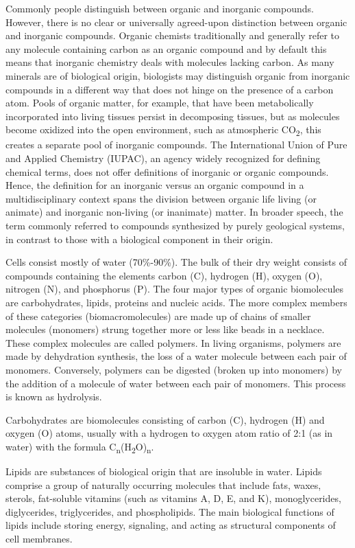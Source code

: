 \documentclass[]{book}
\begin{document}
Commonly people distinguish between organic and inorganic compounds. However, there is no clear or universally agreed-upon distinction between organic and inorganic compounds. Organic chemists traditionally and generally refer to any molecule containing carbon as an organic compound and by default this means that inorganic chemistry deals with molecules lacking carbon. As many minerals are of biological origin, biologists may distinguish organic from inorganic compounds in a different way that does not hinge on the presence of a carbon atom. Pools of organic matter, for example, that have been metabolically incorporated into living tissues persist in decomposing tissues, but as molecules become oxidized into the open environment, such as atmospheric CO\textsubscript{2}, this creates a separate pool of inorganic compounds. The International Union of Pure and Applied Chemistry (IUPAC), an agency widely recognized for defining chemical terms, does not offer definitions of inorganic or organic compounds. Hence, the definition for an inorganic versus an organic compound in a multidisciplinary context spans the division between organic life living (or animate) and inorganic non-living (or inanimate) matter. In broader speech, the term commonly referred to compounds synthesized by purely geological systems, in contrast to those with a biological component in their origin.

Cells consist mostly of water (70\%-90\%). The bulk of their dry weight consists of compounds containing the elements carbon (C), hydrogen (H), oxygen (O), nitrogen (N), and phosphorus (P). The four major types of organic biomolecules are carbohydrates, lipids, proteins and nucleic acids. The more complex members of these categories (biomacromolecules) are made up of chains of smaller molecules (monomers) strung together more or less like beads in a necklace. These complex molecules are called polymers. In living organisms, polymers are made by dehydration synthesis, the loss of a water molecule between each pair of monomers. Conversely, polymers can be digested (broken up into monomers) by the addition of a molecule of water between each pair of monomers. This process is known as hydrolysis.

Carbohydrates are biomolecules consisting of carbon (C), hydrogen (H) and oxygen (O) atoms, usually with a hydrogen to oxygen atom ratio of 2:1 (as in water) with the formula C\textsubscript{n}(H\textsubscript{2}O)\textsubscript{n}.

Lipids are substances of biological origin that are insoluble in water. Lipids comprise a group of naturally occurring molecules that include fats, waxes, sterols, fat-soluble vitamins (such as vitamins A, D, E, and K), monoglycerides, diglycerides, triglycerides, and phospholipids. The main biological functions of lipids include storing energy, signaling, and acting as structural components of cell membranes.
\end{document}
